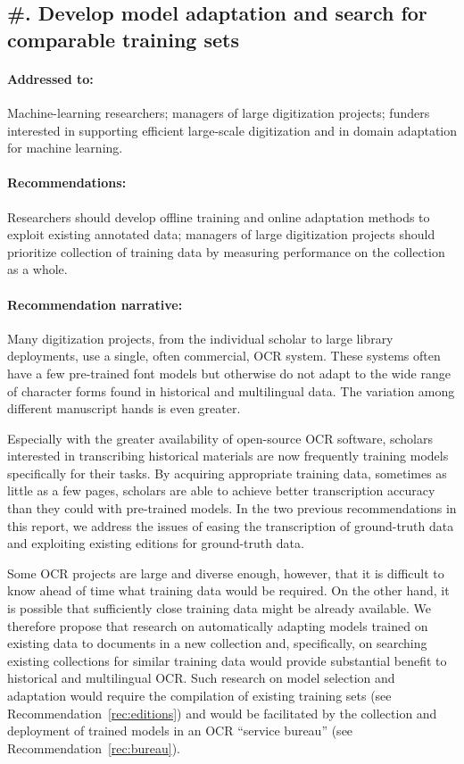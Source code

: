 \documentclass[twoside,11pt]{report}
\newcounter{reccounter}
\renewcommand{\thereccounter}{\arabic{reccounter}}
\newcommand{\recommend}[2]{\refstepcounter{reccounter}%
  \label{rec:#1}%
  \subsection{\#\thereccounter. #2}%
  \label{sec:rec-#1}}
\begin{document}
\recommend{adaptation}{Develop model adaptation and search for comparable training sets}

\paragraph{Addressed to:} Machine-learning researchers; managers of large digitization projects; funders interested in supporting efficient large-scale digitization and in domain adaptation for machine learning.

\paragraph{Recommendations:} Researchers should develop offline training and online adaptation methods to exploit existing annotated data; managers of large digitization projects should prioritize collection of training data by measuring performance on the collection as a whole.

\paragraph{Recommendation narrative:}

Many digitization projects, from the individual scholar to large library deployments, use a single, often commercial, OCR system. These systems often have a few pre-trained font models but otherwise do not adapt to the wide range of character forms found in historical and multilingual data. The variation among different manuscript hands is even greater.

Especially with the greater availability of open-source OCR software, scholars interested in transcribing historical materials are now frequently training models specifically for their tasks. By acquiring appropriate training data, sometimes as little as a few pages, scholars are able to achieve better transcription accuracy than they could with pre-trained models. In the two previous recommendations in this report, we address the issues of easing the transcription of ground-truth data and exploiting existing editions for ground-truth data.

Some OCR projects are large and diverse enough, however, that it is difficult to know ahead of time what training data would be required. On the other hand, it is possible that sufficiently close training data might be already available. We therefore propose that research on automatically adapting models trained on existing data to documents in a new collection and, specifically, on searching existing collections for similar training data would provide substantial benefit to historical and multilingual OCR. Such research on model selection and adaptation would require the compilation of existing training sets (see Recommendation~\ref{rec:editions}) and would be facilitated by the collection and deployment of trained models in an OCR ``service bureau'' (see Recommendation~\ref{rec:bureau}).
\end{document}
